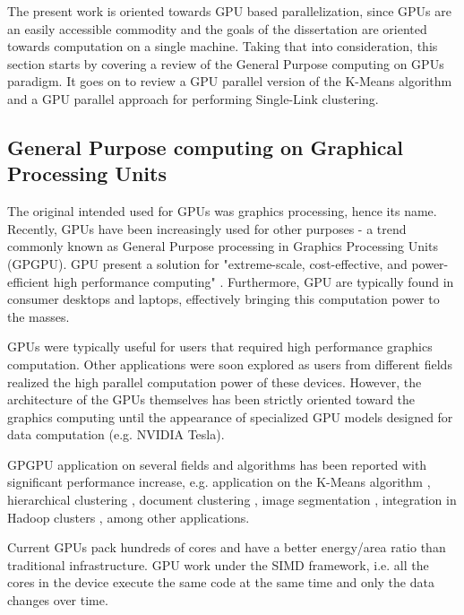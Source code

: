 The present work is oriented towards GPU based parallelization, since GPUs are an easily accessible commodity and the goals of the dissertation are oriented towards computation on a single machine.
Taking that into consideration, this section starts by covering a review of the General Purpose computing on GPUs paradigm.
It goes on to review a GPU parallel version of the K-Means algorithm and a GPU parallel approach for performing Single-Link clustering.

\subsection{General Purpose computing on Graphical Processing Units}
\label{sec:gpgpu}

The original intended used for GPUs was graphics processing, hence its name.
Recently, GPUs have been increasingly used for other purposes - a trend commonly known as General Purpose processing in Graphics Processing Units (GPGPU).
GPU present a solution for "extreme-scale, cost-effective, and power-efficient high performance computing" \cite{Chen2012}.
Furthermore, GPU are typically found in consumer desktops and laptops, effectively bringing this computation power to the masses.

GPUs were typically useful for users that required high performance graphics computation.
Other applications were soon explored as users from different fields realized the high parallel computation power of these devices.
However, the architecture of the GPUs themselves has been strictly oriented toward the graphics computing until the appearance of specialized GPU models designed for data computation (e.g. NVIDIA Tesla).

GPGPU application on several fields and algorithms has been reported with significant performance increase, e.g. application on the K-Means algorithm \cite{Bai2009,Wu2011,Zechner2009,Wu2009a}, hierarchical clustering \cite{Shalom2009,ArulShalom2011}, document clustering \cite{gao20xx}, image segmentation \cite{Sirotkovi2012}, integration in Hadoop clusters \cite{Malakar2013,Grossman2013}, among other applications.

Current GPUs pack hundreds of cores and have a better energy/area ratio than traditional infrastructure.
GPU work under the SIMD framework, i.e. all the cores in the device execute the same code at the same time and only the data changes over time.

